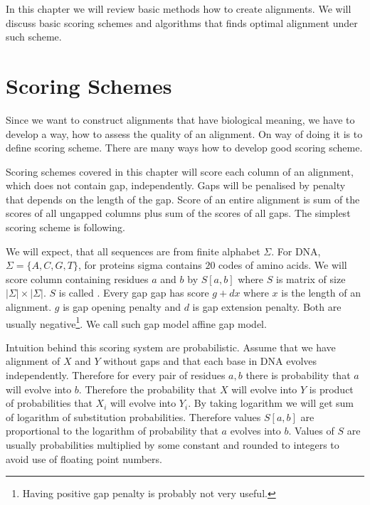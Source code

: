 In this chapter we will review basic methods how to create alignments. We will
discuss basic scoring schemes and algorithms that finds optimal alignment under
such scheme.


\section{Scoring Schemes}

Since we want to construct alignments that have biological meaning, we have to
develop a way, how to assess the quality of an alignment. On way of doing it is
to define scoring scheme. There are many ways how to develop good scoring
scheme. 


Scoring schemes covered in this chapter will score each column of an alignment,
which does not contain gap, independently. Gaps will be penalised by penalty
that depends on the length of the gap. Score of an entire alignment is sum of
the scores of all ungapped columns plus sum of the scores of all gaps. The
simplest scoring scheme is following. 

We will expect, that all sequences are from finite alphabet $\Sigma$. For DNA,
$\Sigma=\{A,C,G,T\}$, for proteins sigma contains $20$ codes of amino acids.
We will score column containing residues
$a$ and $b$ by $S[a,b]$ where $S$ is matrix of size $|\Sigma|\times|\Sigma|$.
$S$ is called .
Every gap gap has score $g+dx$ where $x$ is the length of an alignment. $g$ is gap
opening penalty and $d$ is gap extension penalty. Both are usually
negative\footnote{Having positive gap penalty is probably not very useful.}.  We
call such gap model affine gap model. 

Intuition behind this scoring system are probabilistic. Assume that we have
alignment of $X$ and $Y$ without gaps and that each base in DNA evolves
independently. Therefore for every pair of residues $a,b$ there is probability
that $a$ will evolve into $b$. Therefore the probability that $X$ will evolve
into $Y$ is product of probabilities that $X_i$ will evolve into $Y_i$. By
taking logarithm we will get sum of logarithm of substitution probabilities.
Therefore values $S[a,b]$ are proportional to the logarithm of probability that
$a$ evolves into $b$. Values of $S$ are usually probabilities multiplied by some
constant and rounded to integers to avoid use of floating point numbers. 

